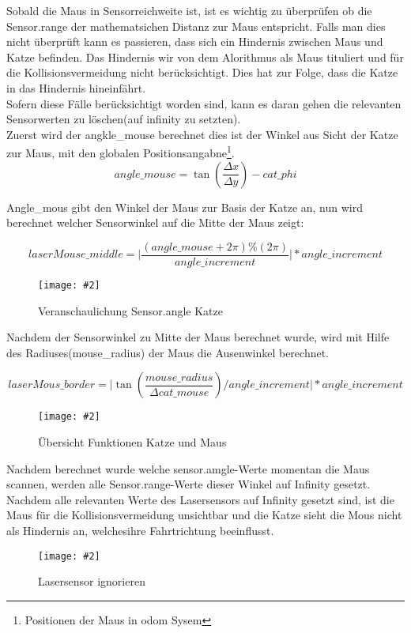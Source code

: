 \documentclass[
a4paper,     %
12pt         %
]{scrartcl}  %
\newcommand{\mygraphics}[3]{
\begin{figure}[!h]
  \begin{center}
    \texttt{[image: \#2]} \\
    \caption{#3}\label{fig:#2}
  \end{center}
\end{figure}

}
\begin{document}
Sobald die Maus in Sensorreichweite ist, ist es wichtig zu überprüfen ob die Sensor.range der mathematsichen Distanz zur Maus entspricht. Falls man dies nicht überprüft kann es passieren, dass sich ein Hindernis zwischen Maus und Katze befinden. Das Hindernis wir von dem Alorithmus als Maus tituliert und für die Kollisionsvermeidung nicht berücksichtigt. Dies hat zur Folge, dass die Katze in das Hindernis hineinfährt.\\

Sofern diese Fälle berücksichtigt worden sind, kann es daran gehen die relevanten Sensorwerten zu löschen(auf infinity zu setzten). \\

Zuerst wird der angkle\_mouse berechnet dies ist der Winkel aus Sicht der Katze zur Maus, mit den globalen Positionsangabne\footnote{Positionen der Maus in odom Sysem}.
\[ angle\_mouse=\tan( \frac{\Delta x}{\Delta y} ) -cat\_phi \]

Angle\_mous gibt den Winkel der Maus zur Basis der Katze an, nun wird berechnet welcher Sensorwinkel auf die Mitte der Maus zeigt:

\[ laserMouse\_middle  =  \vert \frac{ (angle\_mouse + 2  \pi) \% (2 \pi)}{angle\_increment}  \vert * angle\_increment \]
\mygraphics{0.5\textwidth}{collisionANGLE2.png}{Veranschaulichung Sensor.angle Katze}
Nachdem der Sensorwinkel zu Mitte der Maus berechnet wurde, wird mit Hilfe des Radiuses(mouse\_radius) der Maus die Ausenwinkel berechnet.

\[ 
laserMous\_border =  \vert { \tan( \frac{mouse\_radius}{\Delta cat\_mouse} ) } / angle\_increment \vert  * angle\_increment \]
\hspace*{0.63\textwidth}
\mygraphics{0.5\textwidth}{catmous.png}{Übersicht Funktionen Katze und Maus}

Nachdem berechnet wurde welche sensor.amgle-Werte momentan die Maus scannen, werden alle Sensor.range-Werte dieser Winkel auf Infinity gesetzt. Nachdem alle relevanten Werte des Lasersensors auf Infinity gesetzt sind, ist die Maus für die Kollisionsvermeidung unsichtbar und die Katze sieht die Mous nicht als Hindernis an, welchesihre Fahrtrichtung beeinflusst.
\mygraphics{0.5\textwidth}{collisionMOUS.png}{Lasersensor ignorieren }
\end{document}
